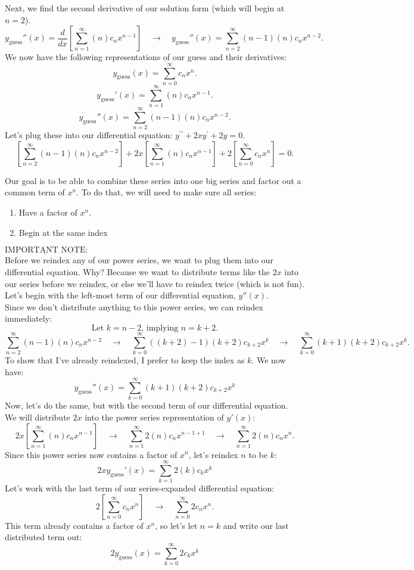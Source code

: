 \documentclass[a4paper,12pt]{article}
\begin{document}
Next, we find the second derivative of our solution form (which will begin at $n=2$).
$$ y_{\text{guess}}''(x) = \frac{d}{dx}\left[\sum_{n=1}^{\infty} (n)c_nx^{n-1}\right] \quad\rightarrow\quad y_{\text{guess}}''(x)= \sum_{n=2}^{\infty} (n-1)(n)c_nx^{n-2}. $$
We now have the following representations of our guess and their derivatives:
$$ y_{\text{guess}}(x) = \sum_{n=0}^{\infty} c_nx^n. $$
$$ y_{\text{guess}}'(x) = \sum_{n=1}^{\infty} (n)c_nx^{n-1}. $$
$$ y_{\text{guess}}''(x)= \sum_{n=2}^{\infty} (n-1)(n)c_nx^{n-2}. $$
Let's plug these into our differential equation: $y^{\prime \prime}+2 x y^{\prime}+2 y=0.$
$$ \left[\sum_{n=2}^{\infty} (n-1)(n)c_nx^{n-2}\right] + 2x\left[\sum_{n=1}^{\infty} (n)c_nx^{n-1}\right] + 2\left[\sum_{n=0}^{\infty} c_nx^n\right]=0. $$
\pagebreak

Our goal is to be able to combine these series into one big series and factor out a common term of $x^n$. To do that, we will need to make sure all series:

\begin{enumerate}
	\item Have a factor of $x^n$.
	\item Begin at the same index
\end{enumerate}

$\boxed{\underline{\text{IMPORTANT NOTE}}}:$\\

 Before we reindex any of our power series, we want to plug them into our differential equation. Why? Because we want to distribute terms like the $2x$ into our series before we reindex, or else we'll have to reindex twice (which is not fun).\\
 
 Let's begin with the left-most term of our differential equation, $y''(x)$.\\
 
Since we don't distribute anything to this power series, we can reindex immediately:
$$ \text{Let }k = n-2 \text{, implying } n = k+2. $$
$$ \sum_{n=2}^{\infty} (n-1)(n)c_nx^{n-2} \quad\rightarrow\quad \sum_{k=0}^{\infty} ((k+2)-1)(k+2)c_{k+2}x^{k} \quad\rightarrow\quad \sum_{k=0}^{\infty} (k+1)(k+2)c_{k+2}x^{k}.$$
To show that I've already reindexed, I prefer to keep the index as $k$. We now have:
$$ y_{\text{guess}}''(x) = \sum_{k=0}^{\infty} (k+1)(k+2)c_{k+2}x^{k} $$
Now, let's do the same, but with the second term of our differential equation.\\
 
 We will distribute $2x$ into the power series representation of $y'(x)$:
 $$ 2x\left[\sum_{n=1}^{\infty} (n)c_nx^{n-1}\right] \quad\rightarrow\quad \sum_{n=1}^{\infty} 2(n)c_nx^{n-1 + 1} \quad\rightarrow\quad \sum_{n=1}^{\infty} 2(n)c_nx^{n}. $$
 Since this power series now contains a factor of $x^n$, let's reindex $n$ to be $k$:
 $$ 2xy_{\text{guess}}'(x) = \sum_{k=1}^{\infty} 2(k)c_kx^{k}$$ 
 Let's work with the last term of our series-expanded differential equation:
 $$ 2\left[\sum_{n=0}^{\infty} c_nx^n\right] \quad\rightarrow\quad \sum_{n=0}^{\infty} 2c_nx^n. $$ 
 This term already contains a factor of $x^n$, so let's let $n = k$ and write our last distributed term out:
 $$ 2y_{\text{guess}}(x) =  \sum_{k=0}^{\infty} 2c_kx^k $$
 
\end{document}
